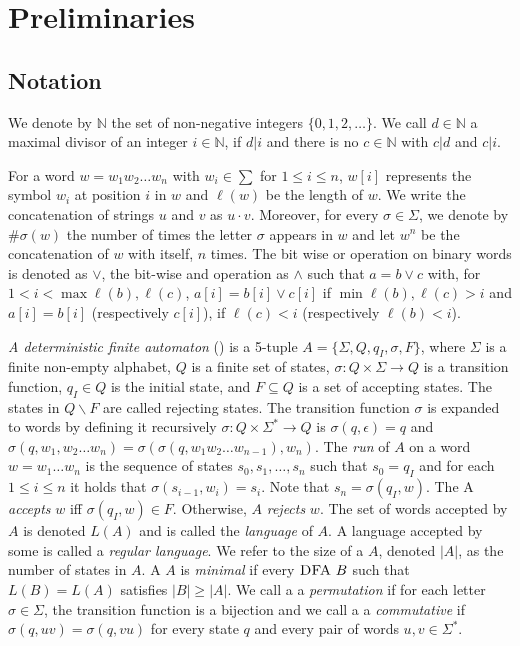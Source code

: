 \chapter{Preliminaries}
\label{ch:preliminaries}

\section{Notation}
\label{ch:prelimiaries:notation}
We denote by $\mathbb{N}$ the set of non-negative integers $\{0, 1, 2, \dots \}$.
We call $d \in \mathbb{N}$ a maximal divisor of an integer $i \in \mathbb{N}$, if $d|i$ and there is no $c \in \mathbb{N}$ with $c|d$ and $c|i$.

For a word $w = w_1 w_2 \dots w_n$ with $w_i \in \sum$ for $1 \leq i \leq n$, $w[i]$ represents the symbol $w_i$ at position $i$ in $w$ and $\ell(w)$ be the length of $w$.
We write the concatenation of strings $u$ and $v$ as $u \cdot v$.
Moreover, for every $\sigma \in \Sigma$, we denote by $\#\sigma(w)$ the number of times the letter $\sigma$ appears in $w$ and let $w^n$ be the concatenation of $w$ with itself, $n$ times.
The bit wise or operation on binary words is denoted as $\lor$, the bit-wise and operation as $\land$ such that $a = b \vee c$ with, for $1 < i < \max{\ell(b), \ell(c)}$, $a[i] = b[i] \vee c[i]$ if $\min{\ell(b), \ell(c)} > i$ and  $a[i] = b[i]$ (respectively $c[i]$), if $\ell(c) < i$ (respectively $\ell(b) < i$).

\textit{A deterministic finite automaton} (\DFA) is a 5-tuple $A = \lbrace\Sigma, Q, q_I , \sigma, F\rbrace$, where $\Sigma$ is a finite non-empty alphabet, $Q$ is a finite set of states, $\sigma : Q \times \Sigma \rightarrow Q$ is a transition function, $q_I \in Q$ is the initial state, and $F \subseteq Q$ is a set of accepting states.
The states in $Q \backslash F$ are called rejecting states.
The transition function $\sigma$ is expanded to words by defining it recursively $\sigma : Q \times \Sigma^* \rightarrow Q$ is $\sigma(q, \epsilon) = q$ and $\sigma(q, w_1, w_2 \dots w_n ) = \sigma(\sigma(q, w_1 w_2 \dots w_{n-1} ), w_n )$.
The \textit{run} of $A$ on a word $w = w_1 \dots w_n$ is the sequence of states $s_0 , s_1 , \dots , s_n$ such that $s_0 = q_I$ and for each $1 \leq i \leq n$ it holds that $\sigma(s_{i-1} , w_i ) = s_i$.
Note that $s_n = \sigma(q_I , w)$. The \DFA A \textit{accepts} $w$ iff $\sigma(q_I , w) \in F$. Otherwise, $A$ \textit{rejects} $w$.
The set of words accepted by $A$ is denoted $L(A)$ and is called the \textit{language} of $A$.
A language accepted by some \DFA is called a \textit{regular language}.
We refer to the size of a \DFA $A$, denoted $|A|$, as the number of states in $A$.
A \DFA $A$ is \textit{minimal} if every $\textsc{DFA}~B$ such that $L(B) = L(A)$ satisfies $|B| \geq |A|$.
We call a \DFA a \textit{permutation \DFA} if for each letter $\sigma \in \Sigma$, the transition function is a bijection and we call a \DFA a \textit{commutative \DFA} if $\sigma(q, uv) = \sigma(q, vu)$ for every state $q$ and every pair of words $u, v \in \Sigma^*$.

